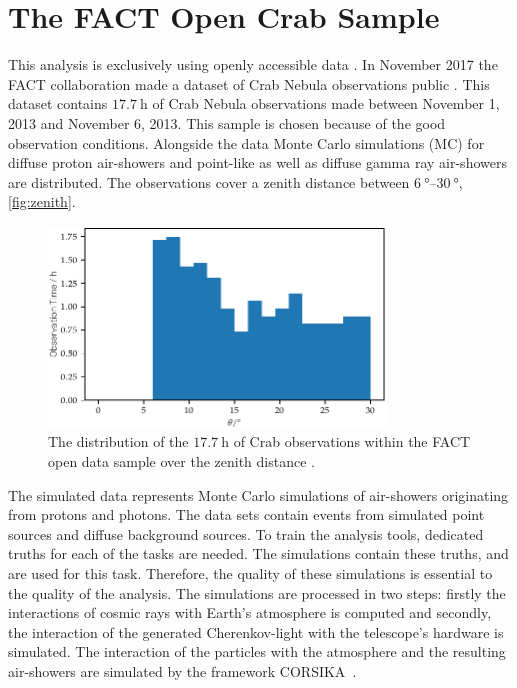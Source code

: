 \chapter{The FACT Open Crab Sample}
%
This analysis is exclusively using openly accessible data \cite{fact-data}. In November 2017 the
FACT collaboration made a dataset of Crab Nebula observations public
\cite{FACT-Design, FACT-Calib}. This dataset contains $\SI{17.7}{\hour}$
of Crab Nebula observations made between November 1, 2013 and November 6, 2013.
This sample is chosen because of the good observation conditions. Alongside the
data Monte Carlo simulations (MC) for diffuse proton air-showers and point-like
as well as diffuse gamma ray air-showers are distributed. The observations
cover a zenith distance between $\SIrange{6}{30}{\degree}$, \autoref{fig:zenith}.
%
\begin{figure}
  \centering%
  \includegraphics[width=0.8\textwidth]{Plots/zenith.pdf}%
  \caption{The distribution of the $\SI{17.7}{\hour}$ of Crab observations within the FACT open data sample over the zenith distance \cite{fact-data}.}%
  \label{fig:zenith}%
\end{figure}
%
The simulated data represents Monte Carlo simulations of air-showers
originating from protons and photons. The data sets contain events from
simulated point sources and diffuse background sources. To train the analysis
tools, dedicated truths for each of the tasks are needed. The simulations
contain these truths, and are used for this task. Therefore, the quality of
these simulations is essential to the quality of the analysis. The simulations
are processed in two steps: firstly the interactions of cosmic rays with Earth's
atmosphere is computed and secondly, the interaction of the generated Cherenkov-light with the telescope's hardware is simulated. The interaction of the particles with the atmosphere and the resulting air-showers are simulated by the framework CORSIKA~\cite{CORSIKA}.

